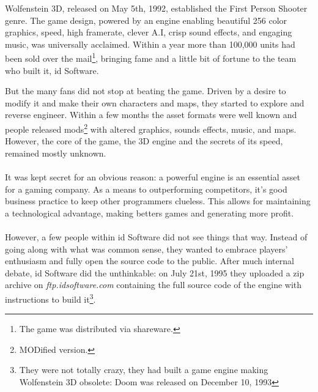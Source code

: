 Wolfenstein 3D, released on May 5th, 1992, established the First Person Shooter genre. The game design, powered by an engine enabling beautiful 256 color graphics, speed, high framerate, clever A.I, crisp sound effects, and engaging music, was universally acclaimed. Within a year more than 100,000 units had been sold over the mail\footnote{The game was distributed via shareware.}, bringing fame and a little bit of fortune to the team who built it, id Software.\\
\par
\begin{figure}[H]
\centering
{}
\end{figure}
\par
But the many fans did not stop at beating the game. Driven by a desire to modify it and make their own characters and maps, they started to explore and reverse engineer. Within a few months the asset formats were well known and people released mods\footnote{MODified version.} with altered graphics, sounds effects, music, and maps. However, the core of the game, the 3D engine and the secrets of its speed, remained mostly unknown.\\
\\
It was kept secret for an obvious reason: a powerful engine is an essential asset for a gaming company. As a means to outperforming competitors, it's good business practice to keep other programmers clueless. This allows for maintaining a technological advantage, making betters games and generating more profit.\\
\\
However, a few people within id Software did not see things that way. Instead of going along with what was common sense, they wanted to embrace players' enthusiasm and fully open the source code to the public. After much internal debate, id Software did the unthinkable: on July 21st, 1995 they uploaded a zip archive on \emph{ftp.idsoftware.com} containing the full source code of the engine with instructions to build it\footnote{They were not totally crazy, they had built a game engine making Wolfenstein 3D obsolete: Doom was released on December 10, 1993}.\\

